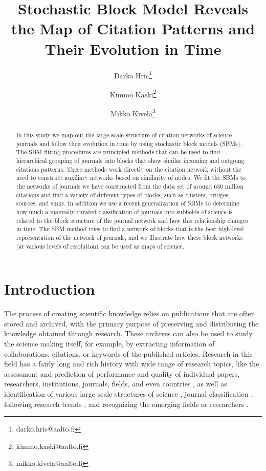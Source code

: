 \documentclass[a4paper,12pt]{article}
\title{Stochastic Block Model Reveals the Map of Citation Patterns and Their Evolution in Time}
\author{Darko Hric\thanks{darko.hric@aalto.fi}}
\author{Kimmo Kaski\thanks{kimmo.kaski@aalto.fi}}
\author{Mikko Kivel\"a\thanks{mikko.kivela@aalto.fi}}
\affil{Department of Computer Science, Aalto University School of Science, P.O.  Box 12200, FI-00076, Finland}
\begin{document}
\maketitle


\begin{abstract}
In this study we map out the large-scale structure of citation networks of science journals and follow their evolution 
in time by using stochastic block models (SBMs).  The SBM fitting procedures are principled 
methods that can be used to find hierarchical grouping of journals into blocks that show similar incoming and outgoing citations patterns. These methods work directly on the 
citation network without the need to construct auxiliary networks based on similarity of nodes.  
We fit the SBMs to the networks of journals we have constructed from the data set of around 630 million 
citations and find a variety of different types of blocks, such as clusters, bridges, 
sources, and sinks.  In addition we use a recent generalization of SBMs to determine how much a 
manually curated classification of journals into subfields of science is related to the 
block structure of the journal network and how this relationship changes in time.  The SBM 
method tries to find a network of blocks that is the best high-level representation of 
the network of journals, and we illustrate how these block networks (at various levels of resolution) 
can be used as maps of science.
\end{abstract}


\section{Introduction}


The process of creating scientific knowledge relies on publications that are often stored and archived, with the primary purpose of preserving and distributing the knowledge obtained through research. These archives can also be used to study the science making itself, for example, by
extracting information of collaborations, citations, or keywords of the published articles.
Research in this field has a fairly long and rich history
with wide range of research topics, like the
assessment and prediction of performance and quality of individual papers, researchers, institutions, journals, fields, and even countries \citep{Taylor1967,Nerur2005,Lehmann2008,Althouse2009}, as well as 
identification of various large scale structures of science \citep{Price1965,Carpenter1973,Small1999,Waltman2010,Leydesdorff2013,Boyack2014},
journal classification \citep{Leydesdorff2006,Janssens2009,Zhang2010,Wang2016},
following research trends \citep{Porter2009,Persson2010,Chen2013},
and recognizing the emerging fields or researchers \citep{Small1989,Lambiotte2009,Cozzens2010,Shibata2011,Small2014}.
\end{document}
